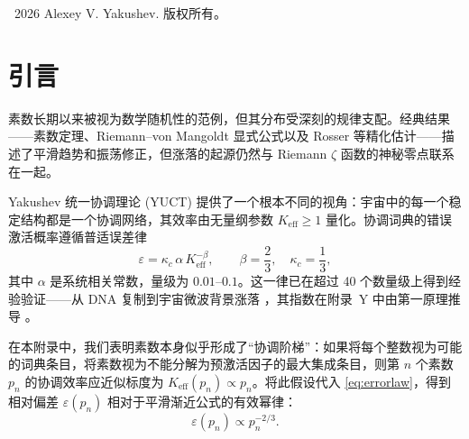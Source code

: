 \documentclass[11pt,a4paper]{article}
\newcommand{\kappac}{\kappa_c}
\begin{document}
\begin{titlepage}
\begin{abstract}
			建立了与 \textbf{斯特恩-布罗科树} 的新联系：标度量子 \(q = (3/2)^{1/3}\) 具有极其刚性的几何结构（其轨迹的 94.4\% 仅由两个 4 位宏块组成），解释了协调阶梯的稳定性。提出了基于斯特恩-布罗科晶格的确定性量子模拟器，表明叠加、纠缠和 CNOT 门是普通的有理坐标算术运算。
			
			残余振荡与黎曼 \(\zeta\) 函数的非平凡零点强相关 (\(R^2>0.99\))，误差的 3D 可视化显示出与真空晶格几何同构的漏斗状结构。提供了素数分析到 YUCT V35.0 拉格朗日量（扇区~103）的形式嵌入。本工作通过表明 YPSDC 协议（由短索引激活的预分布字典）是素数计算和纠缠、隧穿等量子现象的共同基础，消除了量子神秘主义。
			
			即用型 Python 脚本（对数、生产、幂律、相位依赖和量子模拟器）可在 GitHub 上公开获取。
		\end{abstract}
		
		\vspace{0.5cm}
		\textcopyright\ 2026 Alexey V. Yakushev. 版权所有。
	\end{titlepage}
	
	\tableofcontents
	\newpage
	
	\section{引言}
	素数长期以来被视为数学随机性的范例，但其分布受深刻的规律支配。经典结果——素数定理、Riemann–von Mangoldt 显式公式以及 Rosser 等精化估计——描述了平滑趋势和振荡修正，但涨落的起源仍然与 Riemann \(\zeta\) 函数的神秘零点联系在一起。
	
	Yakushev 统一协调理论 (YUCT) 提供了一个根本不同的视角：宇宙中的每一个稳定结构都是一个协调网络，其效率由无量纲参数 \(K_{\mathrm{eff}} \ge 1\) 量化。协调词典的错误激活概率遵循普适误差律
	\begin{equation}\label{eq:errorlaw}
		\varepsilon = \kappac \, \alpha \, K_{\mathrm{eff}}^{-\beta}, \qquad \beta = \frac{2}{3},\quad \kappac = \frac{1}{3},
	\end{equation}
	其中 \(\alpha\) 是系统相关常数，量级为 \(0.01\)–\(0.1\)。这一律已在超过 40 个数量级上得到经验验证——从 DNA 复制到宇宙微波背景涨落 \cite{AppendixL}，其指数在附录~Y 中由第一原理推导 \cite{AppendixY}。
	
	在本附录中，我们表明素数本身似乎形成了“协调阶梯”：如果将每个整数视为可能的词典条目，将素数视为不能分解为预激活因子的最大集成条目，则第 \(n\) 个素数 \(p_n\) 的协调效率应近似标度为 \(K_{\mathrm{eff}}(p_n) \propto p_n\)。将此假设代入 \eqref{eq:errorlaw}，得到相对偏差 \(\varepsilon(p_n)\) 相对于平滑渐近公式的有效幂律：
	\[
	\varepsilon(p_n) \propto p_n^{-2/3}.
	\]
	
\end{document}
